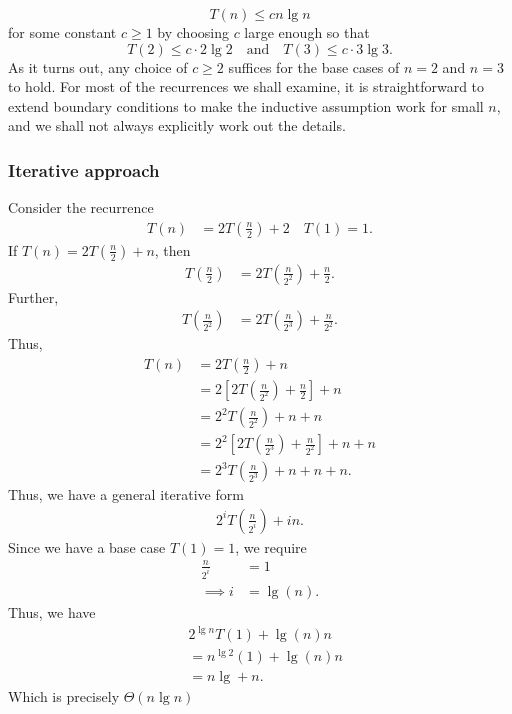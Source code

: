 \documentclass{report}
\begin{document}
        \[
            T(n) \leq c n \lg n
        \]
        for some constant \( c \geq 1 \) by choosing \( c \) large enough so that 
        \[
            T(2) \leq c \cdot 2 \lg 2 \quad \text{and} \quad T(3) \leq c \cdot 3 \lg 3.
        \]
        As it turns out, any choice of \( c \geq 2 \) suffices for the base cases of \( n = 2 \) and \( n = 3 \) to hold. For most of the recurrences we shall examine, it is straightforward to extend boundary conditions to make the inductive assumption work for small \( n \), and we shall not always explicitly work out the details.
        \bigbreak \noindent 
        \subsubsection{Iterative approach}
        \bigbreak \noindent 
        Consider the recurrence
        \begin{align*}
            T(n) &= 2T\left(\frac{n}{2}\right) + 2 \quad T(1) = 1
        .\end{align*}
        \bigbreak \noindent 
        If $T(n) = 2T\left(\frac{n}{2}\right) + n$, then
        \begin{align*}
            T\left(\frac{n}{2}\right) &= 2T\left(\frac{n}{2^{2}}\right) + \frac{n}{2}
        .\end{align*}
        Further,
        \begin{align*}
            T\left(\frac{n}{2^{2}}\right) &= 2T\left(\frac{n}{2^{3}}\right) + \frac{n}{2^{2}}
        .\end{align*}
        Thus,
        \begin{align*}
            T(n) &= 2T\left(\frac{n}{2}\right) + n \\
                 &= 2\left[2T\left(\frac{n}{2^{2}}\right) + \frac{n}{2}\right] + n \\
                 &= 2^{2}T\left(\frac{n}{2^{2}}\right) + n + n \\
                 &= 2^{2}\left[2T\left(\frac{n}{2^{3}}\right) + \frac{n}{2^{2}}\right] + n + n \\
                 &= 2^{3}T\left(\frac{n}{2^{3}}\right) + n + n + n
        .\end{align*}
        Thus, we have a general iterative form
        \begin{align*}
            2^{i}T\left(\frac{n}{2^{i}}\right) + in
        .\end{align*}
        Since we have a base case $T(1) = 1$, we require
        \begin{align*}
            \frac{n}{2^{i}} &=1 \\
            \implies i&=\lg(n) 
        .\end{align*}
        \bigbreak \noindent 
        Thus, we have
        \begin{align*}
            &2^{\lg n}T(1) + \lg(n) n \\
            &=n^{\lg 2}(1) + \lg(n) n \\
            &= n\lg + n
        .\end{align*}
        Which is precisely $\Theta(n\lg n) $
\end{document}
